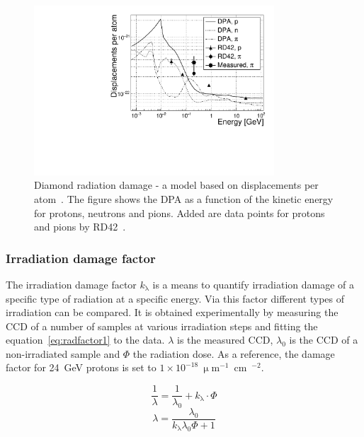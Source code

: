 \begin{figure}[!t]
\begin{center}
\includegraphics[width=0.8\textwidth]{03_measurement_results/scripts/plots/dpa1}
\caption{Diamond radiation damage - a model based on displacements per atom~\cite{Guthoff:2014223}. The figure shows the DPA as a function of the kinetic energy for protons, neutrons and pions. Added are data points for protons and pions by RD42~\cite{RD42IRRAD:00000}. %
}
\label{fig:kitdpa}
\end{center}
\end{figure}

\subsubsection{Irradiation damage factor}
The irradiation damage factor $k_\uplambda$ is a means to quantify irradiation damage of a specific type of radiation at a specific energy. Via this factor different types of irradiation can be compared. It is obtained experimentally by measuring the CCD of a number of samples at various irradiation steps and fitting the equation~\ref{eq:radfactor1} to the data. $\lambda$ is the measured CCD, $\lambda_\mathrm{0}$ is the CCD of a non-irradiated sample and $\Phi$ the radiation dose. As a reference, the damage factor for 24~GeV protons is set to $1\times10^{-18}~\upmu$m$^{-1}$~cm~$^{-2}$.


\begin{equation}
\label{eq:radfactor}
\frac{1}{\lambda} = \frac{1}{\lambda_\mathrm{0}}+k_\uplambda\cdot\Phi
\end{equation} 
\begin{equation}
\label{eq:radfactor1}
\lambda = \frac{\lambda_\mathrm{0}}{k_\uplambda \lambda_0 \Phi + 1}
\end{equation} 






